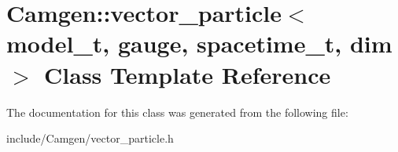 \hypertarget{a00562}{\section{Camgen\-:\-:vector\-\_\-particle$<$ model\-\_\-t, gauge, spacetime\-\_\-t, dim $>$ Class Template Reference}
\label{a00562}
}


The documentation for this class was generated from the following file\-:\begin{DoxyCompactItemize}
\item 
include/\-Camgen/vector\-\_\-particle.\-h\end{DoxyCompactItemize}
